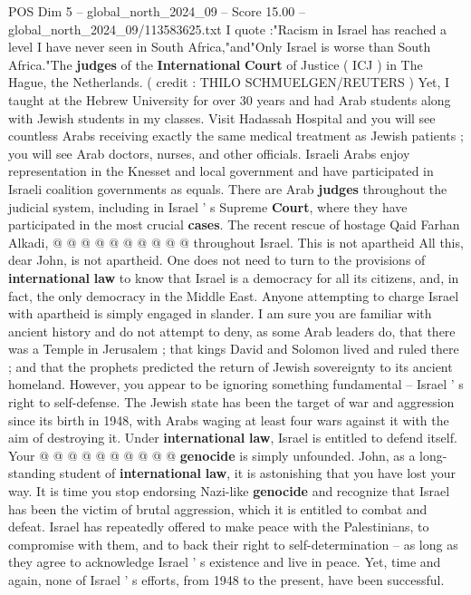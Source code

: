 \begin{textsample}{POS Dim 5 – global\_north\_2024\_09 – Score 15.00 – global\_north\_2024\_09/113583625.txt}
I quote :"Racism in Israel has reached a level I have never seen in South Africa,"and"Only Israel is worse than South Africa."The \textbf{judges} of the \textbf{International} \textbf{Court} of Justice ( ICJ ) in The Hague, the Netherlands. ( credit : THILO SCHMUELGEN/REUTERS ) Yet, I taught at the Hebrew University for over 30 years and had Arab students along with Jewish students in my classes.
Visit Hadassah Hospital and you will see countless Arabs receiving exactly the same medical treatment as Jewish patients ; you will see Arab doctors, nurses, and other officials.
Israeli Arabs enjoy representation in the Knesset and local government and have participated in Israeli coalition governments as equals.
There are Arab \textbf{judges} throughout the judicial system, including in Israel ' s Supreme \textbf{Court}, where they have participated in the most crucial \textbf{cases}.
The recent rescue of hostage Qaid Farhan Alkadi, @ @ @ @ @ @ @ @ @ @ throughout Israel.
This is not apartheid All this, dear John, is not apartheid.
One does not need to turn to the provisions of \textbf{international} \textbf{law} to know that Israel is a democracy for all its citizens, and, in fact, the only democracy in the Middle East.
Anyone attempting to charge Israel with apartheid is simply engaged in slander.
I am sure you are familiar with ancient history and do not attempt to deny, as some Arab leaders do, that there was a Temple in Jerusalem ; that kings David and Solomon lived and ruled there ; and that the prophets predicted the return of Jewish sovereignty to its ancient homeland.
However, you appear to be ignoring something fundamental -- Israel ' s right to self-defense.
The Jewish state has been the target of war and aggression since its birth in 1948, with Arabs waging at least four wars against it with the aim of destroying it.
Under \textbf{international} \textbf{law}, Israel is entitled to defend itself.
Your @ @ @ @ @ @ @ @ @ @ \textbf{genocide} is simply unfounded.
John, as a long-standing student of \textbf{international} \textbf{law}, it is astonishing that you have lost your way.
It is time you stop endorsing Nazi-like \textbf{genocide} and recognize that Israel has been the victim of brutal aggression, which it is entitled to combat and defeat.
Israel has repeatedly offered to make peace with the Palestinians, to compromise with them, and to back their right to self-determination -- as long as they agree to acknowledge Israel ' s existence and live in peace.
Yet, time and again, none of Israel ' s efforts, from 1948 to the present, have been successful.

\end{textsample}
